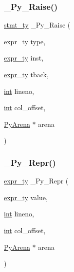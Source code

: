 \subsubsection{\texorpdfstring{\_Py\_Raise()}{\_Py\_Raise()}}
{\footnotesize\ttfamily \mbox{\hyperlink{_python-ast_8h_a39618071027b661bc03e8916e664e1a7}{stmt\+\_\+ty}} \+\_\+\+Py\+\_\+\+Raise (\begin{DoxyParamCaption}\item[{\mbox{\hyperlink{_python-ast_8h_a56d3705e020a071405094a220c4592bd}{expr\+\_\+ty}}}]{type,  }\item[{\mbox{\hyperlink{_python-ast_8h_a56d3705e020a071405094a220c4592bd}{expr\+\_\+ty}}}]{inst,  }\item[{\mbox{\hyperlink{_python-ast_8h_a56d3705e020a071405094a220c4592bd}{expr\+\_\+ty}}}]{tback,  }\item[{\mbox{\hyperlink{warnings_8h_a74f207b5aa4ba51c3a2ad59b219a423b}{int}}}]{lineno,  }\item[{\mbox{\hyperlink{warnings_8h_a74f207b5aa4ba51c3a2ad59b219a423b}{int}}}]{col\+\_\+offset,  }\item[{\mbox{\hyperlink{pyarena_8h_a9edeb357fbb27333471022a0975adb7a}{Py\+Arena}} $\ast$}]{arena }\end{DoxyParamCaption})}

\mbox{\label{_python-ast_8h_aa19b82f9b129467bc767ddf64d7ede62}} 
\subsubsection{\texorpdfstring{\_Py\_Repr()}{\_Py\_Repr()}}
{\footnotesize\ttfamily \mbox{\hyperlink{_python-ast_8h_a56d3705e020a071405094a220c4592bd}{expr\+\_\+ty}} \+\_\+\+Py\+\_\+\+Repr (\begin{DoxyParamCaption}\item[{\mbox{\hyperlink{_python-ast_8h_a56d3705e020a071405094a220c4592bd}{expr\+\_\+ty}}}]{value,  }\item[{\mbox{\hyperlink{warnings_8h_a74f207b5aa4ba51c3a2ad59b219a423b}{int}}}]{lineno,  }\item[{\mbox{\hyperlink{warnings_8h_a74f207b5aa4ba51c3a2ad59b219a423b}{int}}}]{col\+\_\+offset,  }\item[{\mbox{\hyperlink{pyarena_8h_a9edeb357fbb27333471022a0975adb7a}{Py\+Arena}} $\ast$}]{arena }\end{DoxyParamCaption})}

